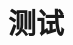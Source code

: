 \documentclass[fontset=none]{Notes}
\begin{document}
\frontmatter

\tableofcontents

\mainmatter

\chapter{测试}
\end{document}
